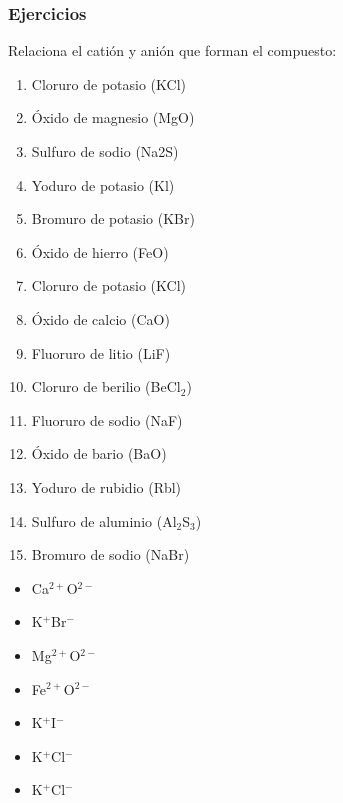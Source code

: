 \documentclass[11pt]{book}
\begin{document}
\subsubsection{Ejercicios}

\begin{boxK}
  Relaciona el catión y anión que forman el compuesto:\\

  \begin{minipage}{0.5\textwidth}
    \begin{enumerate}
      \item Cloruro de potasio (KCl)
      \item Óxido de magnesio (MgO)
      \item Sulfuro  de sodio (Na2S)
      \item Yoduro de potasio (Kl)
      \item Bromuro de potasio (KBr)
      \item Óxido de hierro (FeO)
      \item Cloruro de potasio  (KCl)
      \item Óxido de calcio (CaO)
      \item Fluoruro de litio (LiF)
      \item Cloruro de berilio (BeCl$_2$)
      \item Fluoruro de sodio (NaF)
      \item Óxido de bario (BaO)
      \item Yoduro de rubidio (Rbl)
      \item Sulfuro de aluminio (Al$_2$S$_3$)
      \item Bromuro de sodio (NaBr)
    \end{enumerate}
  \end{minipage}%
  \begin{minipage}{0.5\textwidth}
    \begin{itemize}
      \item[\rule{1cm}{0.2mm}] Ca$^{2+}$O$^{2-}$
      \item[\rule{1cm}{0.2mm}] K$^+$Br$^-$
      \item[\rule{1cm}{0.2mm}] Mg$^{2+}$O$^{2-}$
      \item[\rule{1cm}{0.2mm}] Fe$^{2+}$O$^{2-}$
      \item[\rule{1cm}{0.2mm}] K$^+$I$^-$
      \item[\rule{1cm}{0.2mm}] K$^+$Cl$^-$
      \item[\rule{1cm}{0.2mm}] K$^+$Cl$^-$

\end{itemize}
\end{minipage}
\end{boxK}
\end{document}
